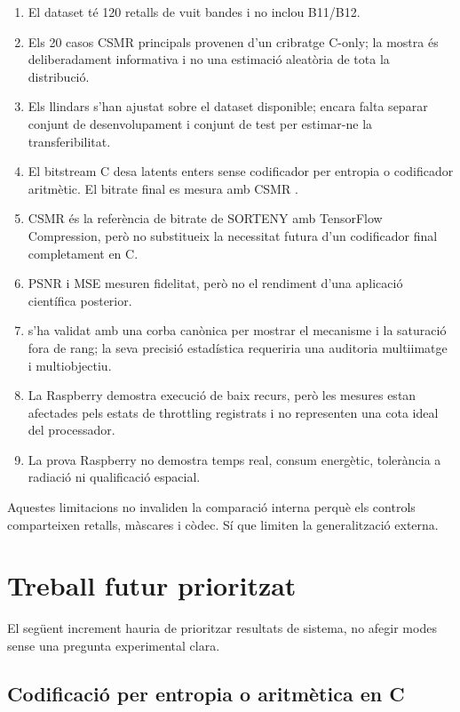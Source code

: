 \begin{enumerate}[leftmargin=*]
  \item El dataset té 120 retalls de vuit bandes i no inclou B11/B12.
  \item Els 20 casos CSMR principals provenen d'un cribratge C-only; la mostra
  és deliberadament informativa i no una estimació aleatòria de tota la
  distribució.
  \item Els llindars s'han ajustat sobre el dataset disponible; encara falta
  separar conjunt de desenvolupament i conjunt de test per estimar-ne la
  transferibilitat.
  \item El bitstream C desa latents enters sense codificador per entropia o
  codificador aritmètic. El bitrate final es mesura amb CSMR .
  \item CSMR és la referència de bitrate de SORTENY amb TensorFlow Compression,
  però no substitueix la necessitat futura d'un codificador final completament
  en C.
  \item PSNR i MSE mesuren fidelitat, però no el rendiment d'una aplicació
  científica posterior.
  \item {} s'ha validat amb una corba canònica per mostrar el
  mecanisme i la saturació fora de rang; la seva precisió estadística requeriria
  una auditoria multiimatge i multiobjectiu.
  \item La Raspberry demostra execució de baix recurs, però les mesures estan
  afectades pels estats de throttling registrats i no representen una cota ideal
  del processador.
  \item La prova Raspberry no demostra temps real, consum energètic, tolerància
  a radiació ni qualificació espacial.
\end{enumerate}

Aquestes limitacions no invaliden la comparació interna perquè els controls
comparteixen retalls, màscares i còdec. Sí que limiten la generalització
externa.

\section{Treball futur prioritzat}\label{sec:future_work}

El següent increment hauria de prioritzar resultats de sistema, no afegir modes
sense una pregunta experimental clara.

\subsection{Codificació per entropia o aritmètica en C}

